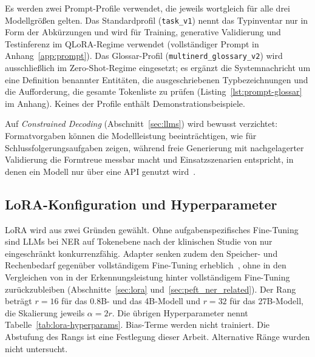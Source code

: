 Es werden zwei Prompt-Profile verwendet, die jeweils wortgleich für alle
drei Modellgrößen gelten.
Das Standardprofil (\texttt{task\_v1}) nennt das Typinventar nur in Form
der Abkürzungen und wird für Training, generative Validierung und
Testinferenz im QLoRA-Regime verwendet (vollständiger Prompt in
Anhang~\ref{app:prompt}).
Das Glossar-Profil (\texttt{multinerd\_\allowbreak glossary\_\allowbreak v2})
wird ausschließlich im Zero-Shot-Regime eingesetzt; es ergänzt die
Systemnachricht um eine Definition benannter Entitäten, die
ausgeschriebenen Typbezeichnungen und die Aufforderung, die gesamte
Tokenliste zu prüfen (Listing~\ref{lst:prompt-glossar} im Anhang).
Keines der Profile enthält Demonstrationsbeispiele.

Auf \emph{Constrained Decoding} (Abschnitt~\ref{sec:llms}) wird bewusst
verzichtet: Formatvorgaben können die Modellleistung beeinträchtigen,
wie \textcite{tam2024speakfreely} für Schlussfolgerungsaufgaben zeigen,
während freie Generierung mit
nachgelagerter Validierung die Formtreue messbar macht und
Einsatzszenarien entspricht, in denen ein Modell nur über eine API
genutzt wird~\cite{dagdelen2024structuredIE}.

\subsection{LoRA-Konfiguration und Hyperparameter}
\label{sec:lora-konfiguration}

LoRA wird aus zwei Gründen gewählt.
Ohne aufgabenspezifisches Fine-Tuning sind LLMs bei NER auf Tokenebene
nach der klinischen Studie von \textcite{lu2024llmstruggle} nur
eingeschränkt konkurrenzfähig.
Adapter senken zudem den Speicher- und Rechenbedarf gegenüber
vollständigem Fine-Tuning erheblich~\cite{hu2021lora,han2024parameter},
ohne in den Vergleichen von
\textcite[Anh.~D, Tab.~11]{zhan2026generativeNER} in der
Erkennungsleistung hinter vollständigem Fine-Tuning zurückzubleiben
(Abschnitte~\ref{sec:lora}
und~\ref{sec:peft_ner_related}).
Der Rang beträgt $r = 16$ für das 0.8B- und das 4B-Modell und $r = 32$
für das 27B-Modell, die Skalierung jeweils $\alpha = 2r$. Die übrigen
Hyperparameter nennt Tabelle~\ref{tab:lora-hyperparams}.
Bias-Terme werden nicht trainiert.
Die Abstufung des Rangs ist eine Festlegung dieser Arbeit. Alternative
Ränge wurden nicht untersucht.

